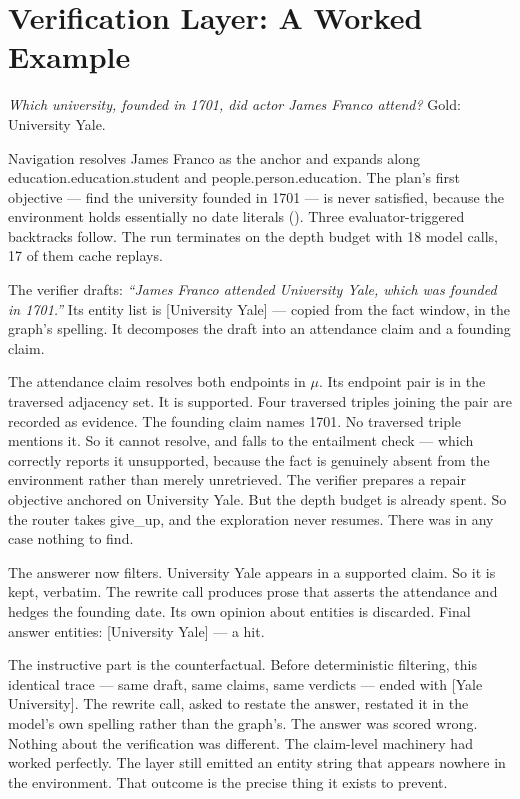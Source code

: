 \section{Verification Layer: A Worked Example}\label{app:verify-walkthrough}

\emph{Which university, founded in 1701, did actor James Franco attend?} Gold:
\textsf{University Yale}.

Navigation resolves \textsf{James Franco} as the anchor and expands along
\textsf{education.\allowbreak education.\allowbreak student} and
\textsf{people.\allowbreak person.\allowbreak education}. The plan's first
objective --- find the university founded in 1701 --- is never satisfied,
because the environment holds essentially no date literals
(). Three evaluator-triggered backtracks follow. The
run terminates on the depth budget with 18 model calls, 17 of them cache
replays.

The verifier drafts: \emph{``James Franco attended University Yale, which was
founded in 1701.''} Its entity list is \textsf{[University Yale]} --- copied
from the fact window, in the graph's spelling. It decomposes the draft into an
attendance claim and a founding claim.

The attendance claim resolves both endpoints in $\mu$. Its endpoint pair
is in the traversed adjacency set. It is supported. Four traversed triples
joining the pair are recorded as evidence. The founding claim names
\textsf{1701}. No traversed triple mentions it. So it cannot resolve, and
falls to the entailment check --- which correctly reports it unsupported,
because the fact is genuinely absent from the environment rather than merely
unretrieved. The verifier prepares a repair objective anchored on
\textsf{University Yale}. But the depth budget is already spent. So the router
takes \textsf{give\_up}, and the exploration never resumes. There was in any
case nothing to find.

The answerer now filters. \textsf{University Yale} appears in a supported claim.
So it is kept, verbatim. The rewrite call produces prose that asserts the
attendance and hedges the founding date. Its own opinion about entities is
discarded. Final answer entities: \textsf{[University Yale]} --- a hit.

The instructive part is the counterfactual. Before deterministic filtering, this
identical trace --- same draft, same claims, same verdicts --- ended with
\textsf{[Yale University]}. The rewrite call, asked to restate the answer,
restated it in the model's own spelling rather than the graph's. The answer
was scored wrong. Nothing about the verification was different. The claim-level
machinery had worked perfectly. The layer still emitted an entity string that
appears nowhere in the environment. That outcome is the precise thing it
exists to prevent.


